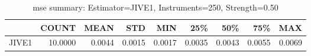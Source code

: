 \begin{table}[ht]
\centering
\caption{mse summary: Estimator=JIVE1, Instruments=250, Strength=0.50}
\begin{tabular}{lrrrrrrrr}
\toprule
 & COUNT & MEAN & STD & MIN & 25\% & 50\% & 75\% & MAX \\
\midrule
JIVE1 & 10.0000 & 0.0044 & 0.0015 & 0.0017 & 0.0035 & 0.0043 & 0.0055 & 0.0069 \\
\bottomrule
\end{tabular}
\end{table}
